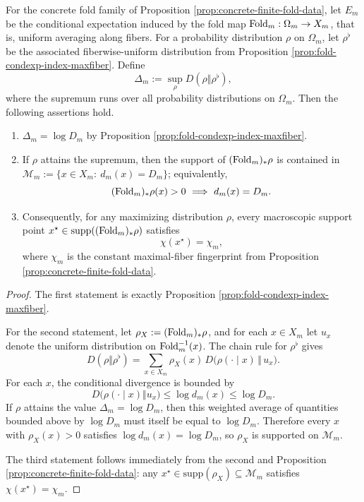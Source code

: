 \begin{theorem}\label{thm:fold-max-data-processing-saturation-chi}

For the concrete fold family of Proposition \ref{prop:concrete-finite-fold-data}, let \(E_m\) be the conditional expectation induced by the fold map \(\operatorname{Fold}_m:\Omega_m\to X_m\), that is, uniform averaging along fibers. For a probability distribution \(\rho\) on \(\Omega_m\), let \(\rho^\flat\) be the associated fiberwise-uniform distribution from Proposition \ref{prop:fold-condexp-index-maxfiber}. Define
\[
\Delta_m:=\sup_{\rho}D(\rho\Vert\rho^\flat),
\]
where the supremum runs over all probability distributions on \(\Omega_m\).
Then the following assertions hold.
\begin{enumerate}
\normalfont
  \item \(\Delta_m=\log D_m\) by Proposition \ref{prop:fold-condexp-index-maxfiber}.
  \item If \(\rho\) attains the supremum, then the support of \((\operatorname{Fold}_m)_\ast\rho\) is contained in \(\mathcal{M}_m:=\{x\in X_m:\ d_m(x)=D_m\}\); equivalently,
  \[
  (\Fold_m)_\ast\rho(x)>0\ \Longrightarrow\ d_m(x)=D_m.
  \]
  \item Consequently, for any maximizing distribution \(\rho\), every macroscopic support point \(x^\star\in \mathrm{supp}((\operatorname{Fold}_m)_\ast\rho)\) satisfies
  \[
  \chi(x^\star)=\chi_m,
  \]
  where \(\chi_m\) is the constant maximal-fiber fingerprint from Proposition \ref{prop:concrete-finite-fold-data}.
\end{enumerate}
\end{theorem}
\begin{proof}
The first statement is exactly Proposition \ref{prop:fold-condexp-index-maxfiber}.

For the second statement, let \(\rho_X:=(\operatorname{Fold}_m)_\ast\rho\), and for each \(x\in X_m\) let \(u_x\) denote the uniform distribution on \(\operatorname{Fold}_m^{-1}(x)\). The chain rule for \(\rho^\flat\) gives
\[
D(\rho\Vert\rho^\flat)
=\sum_{x\in X_m}\rho_X(x)\,D\!\bigl(\rho(\cdot\mid x)\,\Vert\,u_x\bigr).
\]
For each \(x\), the conditional divergence is bounded by
\[
D\!\bigl(\rho(\cdot\mid x)\Vert u_x\bigr)\le \log d_m(x)\le \log D_m.
\]
If \(\rho\) attains the value \(\Delta_m=\log D_m\), then this weighted average of quantities bounded above by \(\log D_m\) must itself be equal to \(\log D_m\). Therefore every \(x\) with \(\rho_X(x)>0\) satisfies \(\log d_m(x)=\log D_m\), so \(\rho_X\) is supported on \(\mathcal M_m\).

The third statement follows immediately from the second and Proposition \ref{prop:concrete-finite-fold-data}: any \(x^\star\in\mathrm{supp}(\rho_X)\subseteq\mathcal M_m\) satisfies \(\chi(x^\star)=\chi_m\).

\end{proof}


